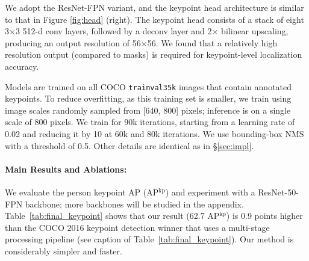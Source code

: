 We adopt the ResNet-FPN variant, and the keypoint head architecture is similar to that in Figure \ref{fig:head} (right). The keypoint head consists of a stack of eight 3$\times$3 512-d conv layers, followed by a deconv layer and 2$\times$ bilinear upscaling, producing an output resolution of 56$\times$56. We found that a relatively high resolution output (compared to masks) is required for keypoint-level localization accuracy.

Models are trained on all COCO \texttt{trainval35k} images that contain annotated keypoints. To reduce overfitting, as this training set is smaller, we train using image scales randomly sampled from [640, 800] pixels; inference is on a single scale of 800 pixels. We train for 90k iterations, starting from a learning rate of 0.02 and reducing it by 10 at 60k and 80k iterations. We use bounding-box NMS with a threshold of 0.5. Other details are identical as in \S\ref{sec:impl}.

\paragraph{Main Results and Ablations:} We evaluate the person keypoint AP (AP$^\text{kp}$) and experiment with a ResNet-50-FPN backbone; more backbones will be studied in the appendix. Table~\ref{tab:final_keypoint} shows that our result (62.7 AP$^\text{kp}$) is 0.9 points higher than the COCO 2016 keypoint detection winner that uses a multi-stage processing pipeline (see caption of Table~\ref{tab:final_keypoint}). Our method is considerably simpler and faster.


